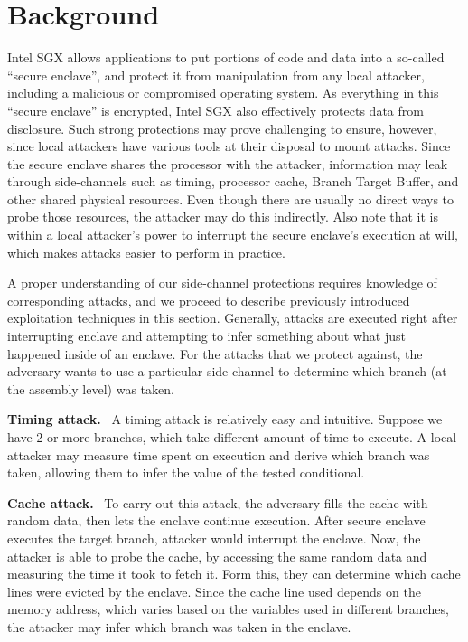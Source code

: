 \documentclass[sigplan, review]{acmart}
\begin{document}
\section{Background}
Intel SGX allows applications to put portions of code and data into a so-called ``secure enclave'', and protect it from manipulation from any local attacker, including a malicious or compromised operating system. As everything in this ``secure enclave'' is encrypted, Intel SGX also effectively protects data from disclosure. Such strong protections may prove challenging to ensure, however, since local attackers have various tools at their disposal to mount attacks. Since the secure enclave shares the processor with the attacker, information may leak through side-channels such as timing, processor cache, Branch Target Buffer, and other shared physical resources. Even though there are usually no direct ways to probe those resources, the attacker may do this indirectly. Also note that it is within a local attacker's power to interrupt the secure enclave's execution at will, which makes attacks easier to perform in practice.

A proper understanding of our side-channel protections requires knowledge of corresponding attacks, and we proceed to describe previously introduced exploitation techniques in this section. Generally, attacks are executed right after interrupting enclave and attempting to infer something about what just happened inside of an enclave. For the attacks that we protect against, the adversary wants to use a particular side-channel to determine which branch (at the assembly level) was taken.

\textbf{Timing attack.}~\cite{kocher1996timing} A timing attack is relatively easy and intuitive. Suppose we have 2 or more branches, which take different amount of time to execute. A local attacker may measure time spent on execution and derive which branch was taken, allowing them to infer the value of the tested conditional.

\textbf{Cache attack.}~\cite{osvik2006cache} To carry out this attack, the adversary fills the cache with random data, then lets the enclave continue execution. After secure enclave executes the target branch, attacker would interrupt the enclave. Now, the attacker is able to probe the cache, by accessing the same random data and measuring the time it took to fetch it. Form this, they can determine which cache lines were evicted by the enclave. Since the cache line used depends on the memory address, which varies based on the variables used in different branches, the attacker may infer which branch was taken in the enclave.
\end{document}

